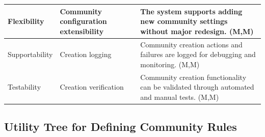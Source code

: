 \documentclass{article}
\begin{document}
\begin{table}[H]
\begin{tabular}{|p{3cm}|p{4cm}|p{7cm}|}
Flexibility
& Community configuration extensibility
& The system supports adding new community settings without major redesign. (M,M) \\
\hline

Supportability
& Creation logging
& Community creation actions and failures are logged for debugging and monitoring. (M,M) \\
\hline

Testability
& Creation verification
& Community creation functionality can be validated through automated and manual tests. (M,M) \\
\hline

\end{tabular}
\end{table}

\subsection{Utility Tree for Defining Community Rules}
\end{document}
